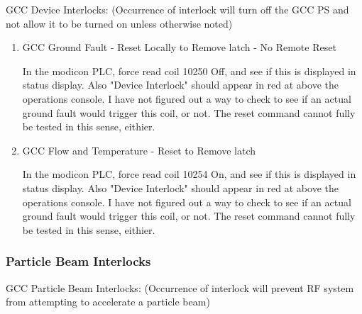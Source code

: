 \documentclass[11pt]{book}		%
\begin{document}
GCC Device Interlocks:
(Occurrence of interlock will turn off the GCC PS and not allow it to be turned on unless otherwise noted)

\begin{enumerate}
 \item GCC Ground Fault - Reset Locally to Remove latch - No Remote Reset

\color{red}
In the modicon PLC, force read coil 10250 Off, and see if this is displayed in status display. Also "Device Interlock" should appear in red at above the operations console. I have not figured out a way to check to see if an actual ground fault would trigger this coil, or not. The reset command cannot fully be tested in this sense, eithier.
\color{black}

 \item GCC Flow and Temperature - Reset to Remove latch

\color{red}
In the modicon PLC, force read coil 10254 On, and see if this is displayed in status display. Also "Device Interlock" should appear in red at above the operations console. I have not figured out a way to check to see if an actual ground fault would trigger this coil, or not. The reset command cannot fully be tested in this sense, eithier.
\color{black}


\end{enumerate}

\subsubsection{Particle Beam Interlocks}

GCC Particle Beam Interlocks:
(Occurrence of interlock will prevent RF system from attempting to accelerate a particle beam)
\end{document}
